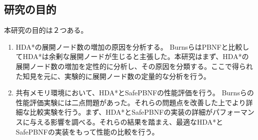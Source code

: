 \documentclass[uplatex]{jsarticle}
\begin{document}
\begin{comment}
BurnsらはマルチコアマシンでHDA*を含めた様々な並列アルゴリズムの性能比較を行い、その中でPBNFとHDA*を有望な(高速な)アルゴリズムとした。その上でPBNFはHDA*よりパフォーマンスに優れると結論をした。その理由として、PBNFがHDA*よりも探索ノード数が小さいという結果があったことを指摘した。しかしながら、Burnsらの比較実験には複数問題点がある。KishimotoらのHDA*の実装がZobrist Hash\cite{Zobrist1970}を用いていたのに対してBurnsらはNaiveなハッシュ関数を用いている。ハッシュ関数によってHDA*の性能は大きく異なると考えられるが、その違いは検証されていない。また、オープンセットをheapで実装しているが、これはBurnsらがベンチマーク問題として扱っている15 Puzzle、4 way Grid-pathfindingにおいて最適な実装ではない\cite{Burns2012implementing}。もう一つ重要な問題点として、ベンチマーク問題のサイズが小さいということが挙げられる。並列アルゴリズムは初期化に時間がかかる為、ある程度問題サイズが大きいものでないと実質的な高速化効率を正確に測ることが出来ない。Burnsらの用いた問題集はA*探索で10秒未満のものが多く、それらが十分な大きさであるかは検証の必要がある。
\newline

これらの理由から、HDA*とPBNFはより詳細な性能評価が必要であると考えられる。また、HDA*のハッシュ関数による挙動の違いも重要な問題である。また、両アルゴリズムのオープンセットの実装がそれぞれどのような影響を与えるかも調査する必要がある。
\end{comment}

\subsection{研究の目的}

本研究の目的は２つある。

\begin{enumerate}
\item HDA*の展開ノード数の増加の原因を分析する。
\vspace{3mm}
\newline
BurnsらはPBNFと比較してHDA*は余剰な展開ノードが生じると主張した。本研究はまず、HDA*の展開ノード数の増加を定性的に分析し、その原因を分類する。ここで得られた知見を元に、実験的に展開ノード数の定量的な分析を行う。
\newline


\item 共有メモリ環境において、HDA*とSafePBNFの性能評価を行う。
\vspace{3mm}
\newline
Burnsらの性能評価実験には二点問題があった。それらの問題点を改善した上でより詳細な比較実験を行う。まず、HDA*とSafePBNFの実装の詳細がパフォーマンスに与える影響を調べる。それらの結果を踏まえ、最適なHDA*とSafePBNFの実装をもって性能の比較を行う。


\end{enumerate}
\end{document}

